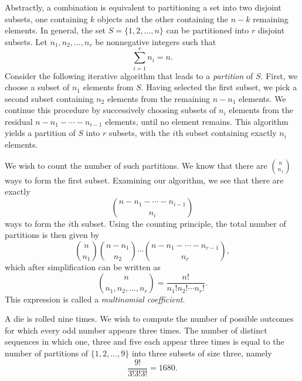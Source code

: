 Abstractly, a combination is equivalent to partitioning a set into two disjoint subsets, one containing $k$ objects and the other containing the $n-k$ remaining elements.
In general, the set $S = \{ 1, 2, \ldots, n \}$ can be partitioned into $r$ disjoint subsets.
Let $n_1, n_2, \ldots, n_r$ be nonnegative integers such that
\begin{equation*}
\sum_{i = 1}^r n_i = n.
\end{equation*}
Consider the following iterative algorithm that leads to a \emph{partition} of $S$. 
First, we choose a subset of $n_1$ elements from $S$.
Having selected the first subset, we pick a second subset containing $n_2$ elements from the remaining $n - n_1$ elements.
We continue this procedure by successively choosing subsets of $n_i$ elements from the residual $n - n_1 - \cdots - n_{i-1}$ elements, until no element remains.
This algorithm yields a partition of $S$ into $r$ subsets, with the $i$th subset containing exactly $n_i$ elements.

We wish to count the number of such partitions.
We know that there are $\binom{n}{n_1}$ ways to form the first subset.
Examining our algorithm, we see that there are exactly
\begin{equation*}
\binom{n - n_1 - \cdots - n_{i-1}}{n_i}
\end{equation*}
ways to form the $i$th subset.
Using the counting principle, the total number of partitions is then given by
\begin{equation*}
\binom{n}{n_1} \binom{n - n_1}{n_2}
\cdots \binom{n - n_1 - \cdots - n_{r-1}}{n_r},
\end{equation*}
which after simplification can be written as
\begin{equation*}
\binom{n}{n_1, n_2, \ldots, n_r}
= \frac{n!}{n_1! n_2! \cdots n_r!} .
\end{equation*}
This expression is called a \emph{multinomial coefficient}. 

\begin{example}
A die is rolled nine times.
We wish to compute the number of possible outcomes for which every odd number appears three times.
The number of distinct sequences in which one, three and five each appear three times is equal to the number of partitions of $\{ 1, 2, \ldots, 9 \}$ into three subsets of size three, namely
\begin{equation*}
\frac{9!}{3! 3! 3!} = 1680 .
\end{equation*}
\end{example}


